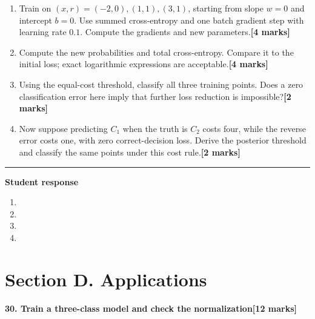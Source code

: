 \documentclass[11pt,a4paper]{article}
\newlength{\BlankAnswerHeight}\setlength{\BlankAnswerHeight}{16mm}
\newcommand{\AnswerBlank}{\leavevmode\par\vspace{\BlankAnswerHeight}}
\begin{document}
\begin{enumerate}[label=(\alph*),leftmargin=8mm,itemsep=3pt]
\item Train on \((x,r)=(-2,0),(1,1),(3,1)\), starting from slope \(w=0\) and intercept \(b=0\). Use summed cross-entropy and one batch gradient step with learning rate \(0.1\). Compute the gradients and new parameters.\hfill\textbf{[4 marks]}
\item Compute the new probabilities and total cross-entropy. Compare it to the initial loss; exact logarithmic expressions are acceptable.\hfill\textbf{[4 marks]}
\item Using the equal-cost threshold, classify all three training points. Does a zero classification error here imply that further loss reduction is impossible?\hfill\textbf{[2 marks]}
\item Now suppose predicting \(C_1\) when the truth is \(C_2\) costs four, while the reverse error costs one, with zero correct-decision loss. Derive the posterior threshold and classify the same points under this cost rule.\hfill\textbf{[2 marks]}
\end{enumerate}\par\medskip\hrule\medskip\textbf{Student response}\par
\begin{enumerate}[label=(\alph*),leftmargin=8mm,itemsep=3pt]
\item
\AnswerBlank
\item
\AnswerBlank
\item
\AnswerBlank
\item
\AnswerBlank
\end{enumerate}
\newpage\section*{Section D. Applications}
\textbf{30. Train a three-class model and check the normalization}\hfill\textbf{[12 marks]}\par\medskip
\end{document}
